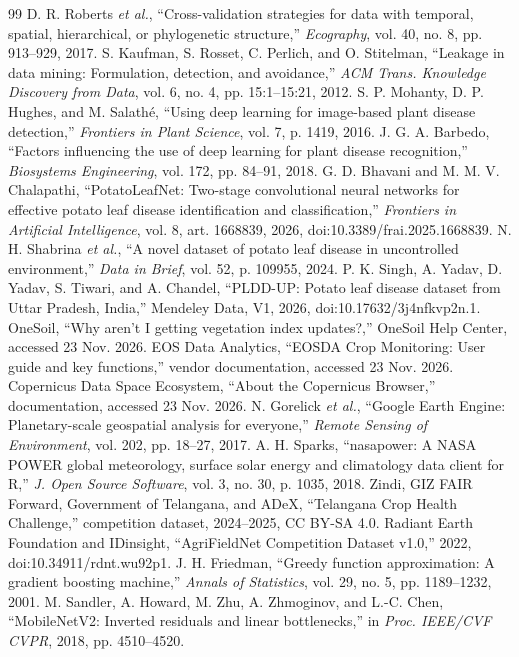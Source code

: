 \documentclass[conference]{IEEEtran}
\begin{document}
\begin{thebibliography}{99}
 D. R. Roberts \emph{et al.}, ``Cross-validation strategies for data with temporal, spatial, hierarchical, or phylogenetic structure,'' \emph{Ecography}, vol. 40, no. 8, pp. 913--929, 2017.
 S. Kaufman, S. Rosset, C. Perlich, and O. Stitelman, ``Leakage in data mining: Formulation, detection, and avoidance,'' \emph{ACM Trans. Knowledge Discovery from Data}, vol. 6, no. 4, pp. 15:1--15:21, 2012.
 S. P. Mohanty, D. P. Hughes, and M. Salath\'e, ``Using deep learning for image-based plant disease detection,'' \emph{Frontiers in Plant Science}, vol. 7, p. 1419, 2016.
 J. G. A. Barbedo, ``Factors influencing the use of deep learning for plant disease recognition,'' \emph{Biosystems Engineering}, vol. 172, pp. 84--91, 2018.
 G. D. Bhavani and M. M. V. Chalapathi, ``PotatoLeafNet: Two-stage convolutional neural networks for effective potato leaf disease identification and classification,'' \emph{Frontiers in Artificial Intelligence}, vol. 8, art. 1668839, 2026, doi:10.3389/frai.2025.1668839.
 N. H. Shabrina \emph{et al.}, ``A novel dataset of potato leaf disease in uncontrolled environment,'' \emph{Data in Brief}, vol. 52, p. 109955, 2024.
 P. K. Singh, A. Yadav, D. Yadav, S. Tiwari, and A. Chandel, ``PLDD-UP: Potato leaf disease dataset from Uttar Pradesh, India,'' Mendeley Data, V1, 2026, doi:10.17632/3j4nfkvp2n.1.
 OneSoil, ``Why aren't I getting vegetation index updates?,'' OneSoil Help Center, accessed 23 Nov. 2026.
 EOS Data Analytics, ``EOSDA Crop Monitoring: User guide and key functions,'' vendor documentation, accessed 23 Nov. 2026.
 Copernicus Data Space Ecosystem, ``About the Copernicus Browser,'' documentation, accessed 23 Nov. 2026.
 N. Gorelick \emph{et al.}, ``Google Earth Engine: Planetary-scale geospatial analysis for everyone,'' \emph{Remote Sensing of Environment}, vol. 202, pp. 18--27, 2017.
 A. H. Sparks, ``nasapower: A NASA POWER global meteorology, surface solar energy and climatology data client for R,'' \emph{J. Open Source Software}, vol. 3, no. 30, p. 1035, 2018.
 Zindi, GIZ FAIR Forward, Government of Telangana, and ADeX, ``Telangana Crop Health Challenge,'' competition dataset, 2024--2025, CC BY-SA 4.0.
 Radiant Earth Foundation and IDinsight, ``AgriFieldNet Competition Dataset v1.0,'' 2022, doi:10.34911/rdnt.wu92p1.
 J. H. Friedman, ``Greedy function approximation: A gradient boosting machine,'' \emph{Annals of Statistics}, vol. 29, no. 5, pp. 1189--1232, 2001.
 M. Sandler, A. Howard, M. Zhu, A. Zhmoginov, and L.-C. Chen, ``MobileNetV2: Inverted residuals and linear bottlenecks,'' in \emph{Proc. IEEE/CVF CVPR}, 2018, pp. 4510--4520.
\end{thebibliography}
\end{document}
